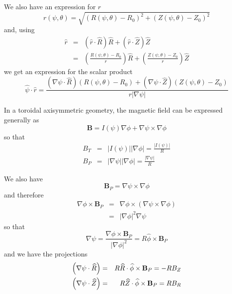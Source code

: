 \documentclass{article}
\begin{document}
We also have an expression for $r$ 
\begin{equation}
r\left( \psi ,\theta \right) =\sqrt{\left( R\left( \psi ,\theta \right)
-R_{0}\right) ^{2}+\left( Z\left( \psi ,\theta \right) -Z_{0}\right) ^{2}}
\label{r}
\end{equation}
and, using 
\begin{eqnarray}
\widehat{r} &=&\left( \widehat{r}\cdot \widehat{R}\right) \widehat{R}+\left( 
\widehat{r}\cdot \widehat{Z}\right) \widehat{Z} \\
&=&\left( \frac{R\left( \psi ,\theta \right) -R_{0}}{r}\right) \widehat{R}%
+\left( \frac{Z\left( \psi ,\theta \right) -Z_{0}}{r}\right) \widehat{Z}
\end{eqnarray}
we get an expression for the scalar product 
\begin{equation}
\widehat{\psi }\cdot \widehat{r}=\frac{\left( \nabla \psi \cdot \widehat{R}%
\right) \left( R\left( \psi ,\theta \right) -R_{0}\right) +\left( \nabla
\psi \cdot \widehat{Z}\right) \left( Z\left( \psi ,\theta \right)
-Z_{0}\right) }{r\left| \nabla \psi \right| }  \label{psidotr}
\end{equation}

In a toroidal axisymmetric geometry, the magnetic field can be expressed
generally as 
\begin{equation}
\mathbf{B}=I\left( \psi \right) \nabla \phi +\nabla \psi \times \nabla \phi 
\label{B}
\end{equation}
so that 
\begin{eqnarray*}
B_{T} &=&\left| I\left( \psi \right) \right| \left| \nabla \phi \right| =%
\frac{\left| I\left( \psi \right) \right| }{R} \\
B_{P} &=&\left| \nabla \psi \right| \left| \nabla \phi \right| =\frac{\left|
\nabla \psi \right| }{R}
\end{eqnarray*}

We also have 
\begin{equation}
\mathbf{B}_{P}=\nabla \psi \times \nabla \phi   \label{Bp}
\end{equation}
and therefore 
\begin{eqnarray*}
\nabla \phi \times \mathbf{B}_{P} &=&\nabla \phi \times \left( \nabla \psi 
\times \nabla \phi \right)  \\
&=&\left| \nabla \phi \right| ^{2}\nabla \psi 
\end{eqnarray*}
so that 
\[
\nabla \psi =\frac{\nabla \phi \times \mathbf{B}_{P}}{\left| \nabla \phi
\right| ^{2}}=R\widehat{\phi }\times \mathbf{B}_{P}
\]
and we have the projections 
\begin{eqnarray*}
\left( \nabla \psi \cdot \widehat{R}\right)  &=&R\widehat{R}\cdot \widehat{%
\phi }\times \mathbf{B}_{P}=-RB_{Z} \\
\left( \nabla \psi \cdot \widehat{Z}\right)  &=&R\widehat{Z}\cdot \widehat{%
\phi }\times \mathbf{B}_{P}=RB_{R}
\end{eqnarray*}
\end{document}
